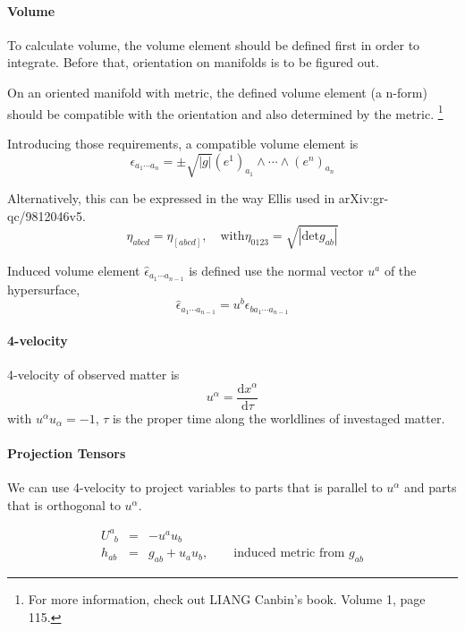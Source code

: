 \documentclass[12pt,a4paper]{book}
\begin{document}
\paragraph{Volume}

To calculate volume, the volume element should be defined first in order to integrate. Before that, orientation on manifolds is to be figured out.

On an oriented manifold with metric, the defined volume element (a n-form) should be compatible with the orientation and also determined by the metric. \footnote{For more information, check out LIANG Canbin's book. Volume 1, page 115.}

Introducing those requirements, a compatible volume element is
\begin{equation}
\epsilon_{a_1\cdots a_n} = \pm \sqrt{|g|} (e^1)_{a_1}\wedge \cdots \wedge (e^n)_{a_n}
\end{equation}

Alternatively, this can be expressed in the way Ellis used in arXiv:gr-qc/9812046v5.
\begin{equation}
\eta_{abcd} = \eta_{[abcd]}, \quad \text{with} \eta_{0123} = \sqrt{|\mathrm {det} g_{ab}|}
\end{equation}

Induced volume element $\hat \epsilon_{a_1\cdots a_{n-1}}$ is defined use the normal vector $u^a$ of the hypersurface,
\begin{equation}
\hat \epsilon_{a_1\cdots a_{n-1}} = u^b \epsilon_{b a_1 \cdots a_{n-1}}
\end{equation}





\paragraph{4-velocity}
4-velocity of observed matter is 
\[u^\alpha = \frac{\mathrm d x^\alpha}{\mathrm d \tau}\]
with $u^\alpha u_\alpha =-1$, $\tau$ is the proper time along the worldlines of investaged matter.

\paragraph{Projection Tensors}

We can use 4-velocity to project variables to parts that is parallel to $u^\alpha$ and parts that is orthogonal to $u^\alpha$.

\begin{eqnarray}
U^a_{\phantom a b} &=& -u^a u_b \\
h_{ab} &=& g_{ab} + u_a u_b, \qquad \text{induced metric from $g_{ab}$}
\end{eqnarray}
\end{document}
